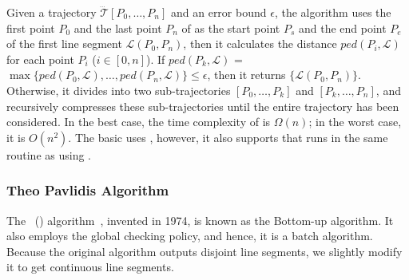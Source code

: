 Given a trajectory $\dddot{\mathcal{T}}[P_0, \ldots, P_n]$ and an error bound $\epsilon$, the algorithm uses the first point $P_0$ and the last point $P_n$ of  as the start point $P_s$ and the end point $P_e$ of the first line segment $\mathcal{L}(P_0, P_n)$, then it calculates the distance $ped(P_i, {\mathcal{L}})$ for each point $P_i$ ($i\in[0,n]$). If $ped(P_k, {\mathcal{L}})$ = $\max \{ped(P_0, {\mathcal{L}}), \ldots, ped(P_n, {\mathcal{L}}) \} \le \epsilon$, then it returns $\{\mathcal{L}(P_0,P_n)\}$. Otherwise, it divides  into two sub-trajectories $[P_0, \ldots, P_k]$ and $[P_{k}, \ldots, P_n]$, and recursively compresses these sub-trajectories until the entire trajectory has been considered.
%
In the best case, the time complexity of \dpa is $\Omega(n)$; in the worst case, it is $O(n^2)$.
The basic \dpa uses \ped, however, it also supports \sed \cite{Meratnia:Spatiotemporal} that runs in the same routine as using \ped. %




\vspace{-1ex}
\subsubsection{Theo Pavlidis Algorithm}

The {\pavlidis~(\tpa) algorithm}~\cite{Pavlidis:Segment}, invented in 1974, is known as the Bottom-up algorithm. It also employs the global checking policy, and hence, it is a batch algorithm. Because the original \tpa algorithm outputs disjoint line segments, we slightly modify it to get continuous line segments.

